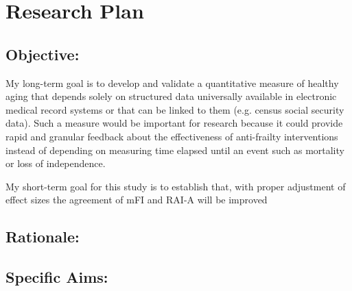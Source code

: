 \section{Research Plan }\label{research-plan}


\subsection{Objective:}\label{objective}
  
My long-term goal is to develop and validate a quantitative measure of healthy aging that depends solely on structured data universally available in electronic medical record systems or that can be linked to them (e.g. census social security data). Such a measure would be important for research because it could provide rapid and granular feedback about the effectiveness of anti-frailty interventions instead of depending on measuring time elapsed until an event such as mortality or loss of independence.

My short-term goal for this study is to establish that, with proper adjustment of effect sizes the agreement of mFI and RAI-A will be improved

\subsection{Rationale:}\label{rationale}

\subsection{Specific Aims:}\label{specific-aims}
